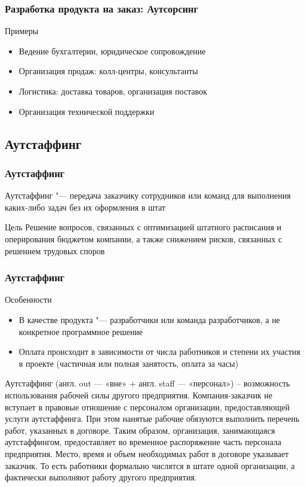 \documentclass{../industrial-development}
\begin{document}
\begin{frame} \frametitle{Разработка продукта на заказ: Аутсорсинг}
	\begin{block}{Примеры}
		\begin{itemize}
			\item Ведение бухгалтерии, юридическое сопровождение
			\item Организация продаж: колл-центры, консультанты
			\item Логистика: доставка товаров, организация поставок
			\item Организация технической поддержки
		\end{itemize}
	\end{block}
\end{frame}
\lecturenotes


\subsection{Аутстаффинг}


\begin{frame} \frametitle{Аутстаффинг}
	\begin{block}{}
		\alert{Аутстаффинг} "--- передача заказчику сотрудников или команд для выполнения каких-либо задач без их оформления в штат
	\end{block}
	\begin{block}{Цель}
		Решение вопросов, связанных с оптимизацией штатного расписания и оперирования бюджетом компании, а также снижением рисков, связанных с решением трудовых споров
	\end{block}
\end{frame}
\lecturenotes


\begin{frame} \frametitle{Аутстаффинг}
	\begin{block}{Особенности}
		\begin{itemize}
			\item В качестве продукта "--- разработчики или команда разработчиков, а не конкретное программное решение
			\item Оплата происходит в зависимости от числа работников и степени их участия в проекте (частичная или полная занятость, оплата за часы)
		\end{itemize}
	\end{block}
\end{frame}
\lecturenotes
Аутстаффинг (англ. out — «вне» + англ. staff — «персонал») – возможность использования рабочей силы другого предприятия. Компания-заказчик не вступает в правовые отношение с персоналом организации, предоставляющей услуги аутстаффинга. При этом нанятые рабочие обязуются выполнить перечень работ, указанных в договоре. Таким образом, организация, занимающаяся аутстаффингом, предоставляет во временное распоряжение часть персонала предприятия. Место, время и объем необходимых работ в договоре указывает заказчик. То есть работники формально числятся в штате одной организации, а фактически выполняют работу другого предприятия.
\end{document}
